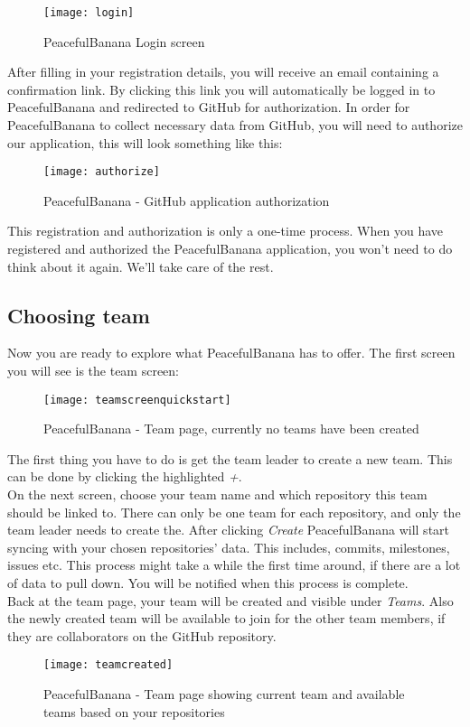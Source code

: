 \begin{figure}[h!]
\label{login}
\centering
	\texttt{[image: login]}
\caption{PeacefulBanana Login screen}
\end{figure}
\pagebreak

After filling in your registration details, you will receive an email containing a confirmation link. By clicking this link you will automatically be logged in to PeacefulBanana and redirected to GitHub for authorization. 
In order for PeacefulBanana to collect necessary data from GitHub, you will need to authorize our application, this will look something like this: 

\begin{figure}[h!]
\label{authorize}
\centering
	\texttt{[image: authorize]}
\caption{PeacefulBanana - GitHub application authorization}
\end{figure}

This registration and authorization is only a one-time process. When you have registered and authorized the PeacefulBanana application, you won't need to do think about it again. We'll take care of the rest. 
\pagebreak

\subsection{Choosing team}
Now you are ready to explore what PeacefulBanana has to offer. The first screen you will see is the team screen:

\begin{figure}[h!]
\label{teamscreen}
\centering
	\texttt{[image: teamscreenquickstart]}
\caption{PeacefulBanana - Team page, currently no teams have been created}
\end{figure}

The first thing you have to do is get the team leader to create a new team. This can be done by clicking the highlighted \emph{+}. \\
On the next screen, choose your team name and which repository this team should be linked to. There can only be one team for each repository, and only the team leader needs to create the. After clicking \textit{Create} PeacefulBanana will start syncing with your chosen repositories' data. This includes, commits, milestones, issues etc. This process might take a while the first time around, if there are a lot of data to pull down. You will be notified when this process is complete.\\
Back at the team page, your team will be created and visible under \emph{Teams}. Also the newly created team will be available to join for the other team members, if they are collaborators on the GitHub repository. 
\begin{figure}[h!]
\label{teamcreated}
\centering
	\texttt{[image: teamcreated]}
\caption{PeacefulBanana - Team page showing current team and available teams based on your repositories}
\end{figure}


